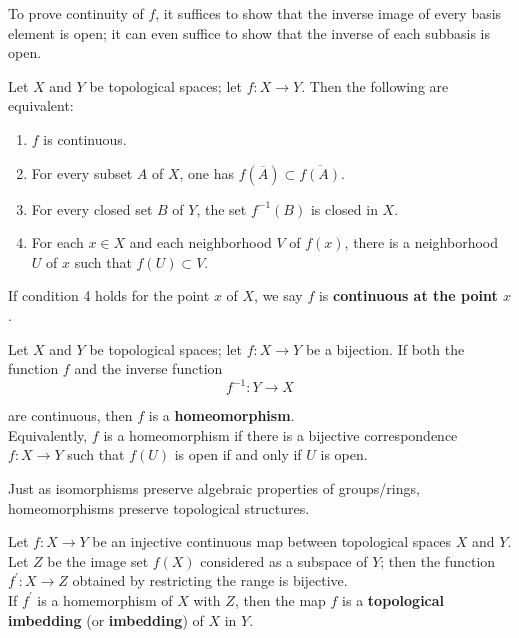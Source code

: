 \begin{remark}
To prove continuity of $f$, it suffices to show that the inverse image of every basis element is open; 
it can even suffice to show that the inverse of each subbasis is open.
\end{remark}

\begin{theorem}
Let $X$ and $Y$ be topological spaces; let $f \colon X \rightarrow Y$. Then the following are equivalent:
\begin{enumerate}
    \item $f$ is continuous.
    \item For every subset $A$ of $X$, one has $f(\overline{A}) \subset \overline{f(A)}$.
    \item For every closed set $B$ of $Y$, the set $f^{-1}(B)$ is closed in $X$.
    \item For each $x \in X$ and each neighborhood $V$ of $f(x)$, there is a neighborhood $U$ of $x$ such that $f(U) \subset V$. 
\end{enumerate}

If condition 4 holds for the point $x$ of $X$, we say $f$ is \textbf{continuous at the point $x$}.
\end{theorem}

\begin{definition}[Homeomorphism]
Let $X$ and $Y$ be topological spaces; let $f \colon X \rightarrow Y$ be a bijection. If both the function $f$ and the inverse function
\[
    f^{-1} \colon Y \rightarrow X
\]

are continuous, then $f$ is a \textbf{homeomorphism}. \\

Equivalently, $f$ is a homeomorphism if there is a bijective correspondence $f \colon X \rightarrow Y$ such that $f(U)$ is open if and only if $U$ is open.
\end{definition}

\begin{remark}
Just as isomorphisms preserve algebraic properties of groups/rings, homeomorphisms preserve topological structures.
\end{remark}

\begin{definition}[Imbedding]
Let $f \colon X \rightarrow Y$ be an injective continuous map between topological spaces $X$ and $Y$. Let $Z$ be the image set $f(X)$ considered as a subspace of $Y$;
then the function $f^{\prime} \colon X \rightarrow Z$ obtained by restricting the range is bijective. \\

If $f^{\prime}$ is a homemorphism of $X$ with $Z$, then the map $f$ is a \textbf{topological imbedding} (or \textbf{imbedding}) of $X$ in $Y$.
\end{definition}

